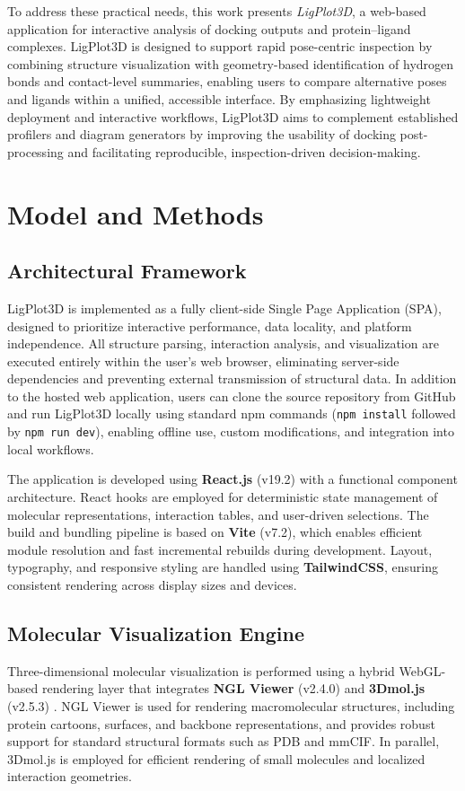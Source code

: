 \documentclass[lettersize,journal]{IEEEtran}
\begin{document}
To address these practical needs, this work presents \textit{LigPlot3D}, a web-based application for interactive analysis of docking outputs and protein--ligand complexes. LigPlot3D is designed to support rapid pose-centric inspection by combining structure visualization with geometry-based identification of hydrogen bonds and contact-level summaries, enabling users to compare alternative poses and ligands within a unified, accessible interface. By emphasizing lightweight deployment and interactive workflows, LigPlot3D aims to complement established profilers and diagram generators by improving the usability of docking post-processing and facilitating reproducible, inspection-driven decision-making.

\section{Model and Methods}

\subsection{Architectural Framework}
LigPlot3D is implemented as a fully client-side Single Page Application (SPA), designed to prioritize interactive performance, data locality, and platform independence. All structure parsing, interaction analysis, and visualization are executed entirely within the user’s web browser, eliminating server-side dependencies and preventing external transmission of structural data. In addition to the hosted web application, users can clone the source repository from GitHub and run LigPlot3D locally using standard npm commands (\texttt{npm install} followed by \texttt{npm run dev}), enabling offline use, custom modifications, and integration into local workflows.

The application is developed using \textbf{React.js} (v19.2) \cite{reactjs} with a functional component architecture. React hooks are employed for deterministic state management of molecular representations, interaction tables, and user-driven selections. The build and bundling pipeline is based on \textbf{Vite} (v7.2), which enables efficient module resolution and fast incremental rebuilds during development. Layout, typography, and responsive styling are handled using \textbf{TailwindCSS}, ensuring consistent rendering across display sizes and devices.

\subsection{Molecular Visualization Engine}
Three-dimensional molecular visualization is performed using a hybrid WebGL-based rendering layer that integrates \textbf{NGL Viewer} (v2.4.0) \cite{rose2018ngl} and \textbf{3Dmol.js} (v2.5.3) \cite{rego20153dmol}. NGL Viewer is used for rendering macromolecular structures, including protein cartoons, surfaces, and backbone representations, and provides robust support for standard structural formats such as PDB and mmCIF. In parallel, 3Dmol.js is employed for efficient rendering of small molecules and localized interaction geometries.
\end{document}
